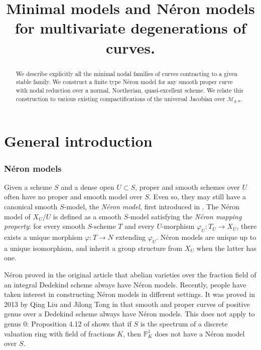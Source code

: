 \documentclass[a4paper,12pt]{amsart} %
\title[label]{Minimal models and N\'eron models for multivariate degenerations of curves.}
\numberwithin{equation}{subsection}
\newcommand{\ca}[1]{{\mathcal{#1}}}
\theoremstyle{definition}
\theoremstyle{plain}%
\theoremstyle{remark}
\renewcommand{\phi}{\varphi}
\begin{document}
	
	\begin{abstract} 
We describe explicitly all the minimal nodal families of curves contracting to a given stable family. We construct a finite type N\'eron model for any smooth proper curve with nodal reduction over a normal, Noetherian, quasi-excellent scheme. We relate this construction to various existing compactifications of the universal Jacobian over $\overline{\ca M}_{g,n}$.
	\end{abstract}
	
	\maketitle
	
	
	\tableofcontents


\part*{General introduction}


\section*{N\'eron models}
Given a scheme $S$ and a dense open $U\subset S$, proper and smooth schemes over $U$ often have no proper and smooth model over $S$. Even so, they may still have a canonical smooth $S$-model, the \emph{N\'eron model}, first introduced in \cite{neron_article}. The N\'eron model of $X_U/U$ is defined as a smooth $S$-model satisfying the \emph{Néron mapping property}: for every smooth $S$-scheme $T$ and every $U$-morphism $\phi_U\colon T_U\rightarrow X_U$, there exists a unique morphism $\phi\colon T\to N$ extending $\phi_U$. Néron models are unique up to a unique isomorphism, and inherit a group structure from $X_U$ when the latter has one.

Néron proved in the original article \cite{neron_article} that abelian varieties over the fraction field of an integral Dedekind scheme always have N\'eron models. Recently, people have taken interest in constructing N\'eron models in different settings. It was proved in 2013 by Qing Liu and Jilong Tong in \cite{LiuTong} that smooth and proper curves of positive genus over a Dedekind scheme always have N\'eron models. This does not apply to genus $0$: Proposition 4.12 of \cite{LiuTong} shows that if $S$ is the spectrum of a discrete valuation ring with field of fractions $K$, then $\mathbb P^1_K$ does not have a N\'eron model over $S$.
\end{document}
